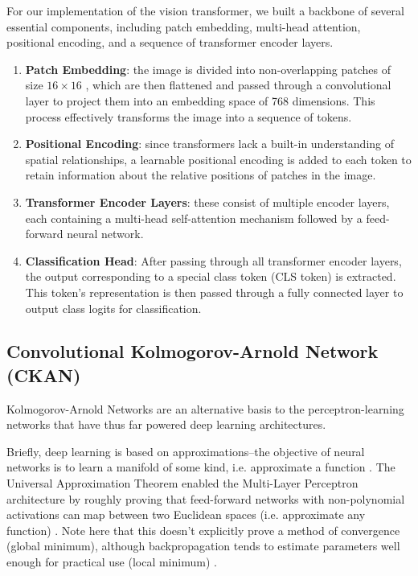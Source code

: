 \documentclass[conference]{IEEEtran}
\begin{document}
For our implementation of the vision transformer, we built a backbone of several essential components, including patch embedding, multi-head attention, positional encoding, and a sequence of transformer encoder layers.
\begin{enumerate} 
    \item \textbf{Patch Embedding}: the image is divided into non-overlapping patches of size $16 \times 16$ , which are then flattened and passed through a convolutional layer to project them into an embedding space of 768 dimensions. This process effectively transforms the image into a sequence of tokens.
    \item \textbf{Positional Encoding}: since transformers lack a built-in understanding of spatial relationships, a learnable positional encoding is added to each token to retain information about the relative positions of patches in the image.

    \item \textbf{Transformer Encoder Layers}: these consist of multiple encoder layers, each containing a multi-head self-attention mechanism followed by a feed-forward neural network. %

    \item \textbf{Classification Head}: After passing through all transformer encoder layers, the output corresponding to a special class token (CLS token) is extracted. This token's representation is then passed through a fully connected layer to output class logits for classification.
\end{enumerate}


\subsection{Convolutional Kolmogorov-Arnold Network (CKAN)}
Kolmogorov-Arnold Networks are an alternative basis to the perceptron-learning networks that have thus far powered deep learning architectures.

Briefly, deep learning is based on approximations--the objective of neural networks is to learn a manifold of some kind, i.e. approximate a function \cite{mlp_approx_thm}. The Universal Approximation Theorem enabled the Multi-Layer Perceptron architecture by roughly proving that feed-forward networks with non-polynomial activations can map between two Euclidean spaces (i.e. approximate any function) \cite{mlp_approx_thm}. Note here that this doesn't explicitly prove a method of convergence (global minimum), although backpropagation tends to estimate parameters well enough for practical use (local minimum) \cite{mlp_approx_thm}.
\end{document}
